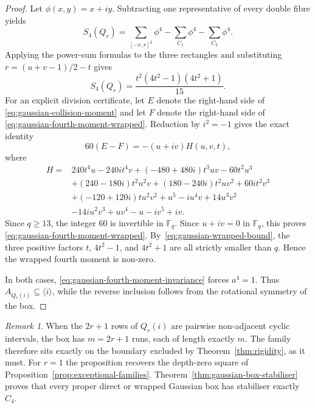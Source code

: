 \documentclass[11pt,a4paper]{article}
\theoremstyle{definition}
\theoremstyle{remark}
\newtheorem{remark}[theorem]{Remark}
\newcommand{\Fq}{\mathbb{F}_q}
\begin{document}
\begin{proof}
  Let $\phi(x,y)=x+iy$.
  Subtracting one representative of every double fibre yields
  \begin{equation}
    S_4(Q_r)
    =\sum_{[-r,r]^2}\phi^4
     -\sum_{C_1}\phi^4
     -\sum_{C_2}\phi^4.
    \label{eq:gaussian-collision-moment}
  \end{equation}
  Applying the power-sum formulas to the three rectangles and substituting
  $r=(u+v-1)/2-t$ gives
  \begin{equation}
    S_4(Q_r)=\frac{t^2(4t^2-1)(4t^2+1)}{15}.
    \label{eq:gaussian-fourth-moment-wrapped}
  \end{equation}
  For an explicit division certificate, let $E$ denote the right-hand side of
  \eqref{eq:gaussian-collision-moment} and let $F$ denote the right-hand side of
  \eqref{eq:gaussian-fourth-moment-wrapped}.
  Reduction by $i^2=-1$ gives the exact identity
  \begin{equation}
    60(E-F)=-(u+iv)H(u,v,t),
    \label{eq:gaussian-division-certificate}
  \end{equation}
  where
  \begin{align*}
    H={}&240t^4u-240it^4v+(-480+480i)t^3uv-60t^2u^3\\
       &+(240-180i)t^2u^2v+(180-240i)t^2uv^2+60it^2v^3\\
       &+(-120+120i)tu^2v^2+u^5-iu^4v+14u^3v^2\\
       &-14iu^2v^3+uv^4-u-iv^5+iv.
  \end{align*}
  Since $q\ge 13$, the integer $60$ is invertible in $\Fq$.
  Since $u+iv=0$ in $\Fq$, this proves
  \eqref{eq:gaussian-fourth-moment-wrapped}.
  By~\eqref{eq:gaussian-wrapped-bound}, the three positive factors
  $t$, $4t^2-1$, and $4t^2+1$ are all strictly smaller than $q$.
  Hence the wrapped fourth moment is non-zero.

  In both cases, \eqref{eq:gaussian-fourth-moment-invariance} forces $a^4=1$.
  Thus $A_{Q_r(i)}\subseteq\langle i\rangle$, while the reverse inclusion follows from
  the rotational symmetry of the box.
\end{proof}

\begin{remark}
  \label{rem:box-degenerate}
  When the $2r+1$ rows of $Q_r(i)$ are pairwise non-adjacent cyclic intervals, the box has
  $m=2r+1$ runs, each of length exactly $m$.
  The family therefore sits exactly on the boundary excluded by
  Theorem~\ref{thm:rigidity}, as it must.
  For $r=1$ the proposition recovers the depth-zero square of
  Proposition~\ref{prop:exceptional-families}.
  Theorem~\ref{thm:gaussian-box-stabiliser} proves that every proper direct or wrapped
  Gaussian box has stabiliser exactly $C_4$.
\end{remark}
\end{document}

